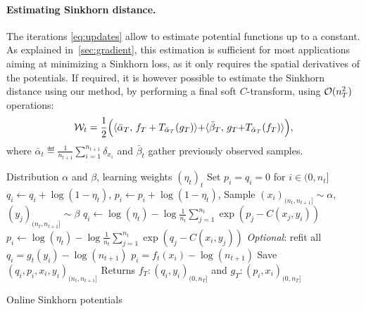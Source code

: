\paragraph{Estimating Sinkhorn distance.} 

The iterations \eqref{eq:updates} allow to estimate potential functions up to a constant. As explained in~\autoref{sec:gradient},
this estimation is sufficient for most applications aiming at minimizing a Sinkhorn loss, as it only requires the spatial derivatives of the potentials.
%
If required, it is however possible to estimate the Sinkhorn distance using our method, by performing a final soft $C$-transform, using $\Oo(n_T^2)$ operations:
\begin{equation}\label{eq-dist-est}
    \Ww_t = \frac{1}{2}\Big(\dotp{\bar \alpha_T}{f_T + \Ctrans{g_T}{\bar \alpha_T}}
     {+} \dotp{\bar \beta_T}{g_T {+} \Ctrans{f_T}{\bar \alpha_T}}\Big),
\end{equation}
where $\bar \alpha_t \eqdef \frac{1}{n_{t+1}}\sum_{i=1}^{n_{t+1}} \delta_{x_i}$
and $\bar \beta_t$ gather previously observed samples.

\begin{algorithm}[t]
    \begin{algorithmic}
    \Input Distribution $\alpha$ and $\beta$, learning weights ${(\eta_t)}_t$
    \State Set $p_i = q_i = 0$ for $i \in (0, n_t]$
        \For{$i \in (0, n_t]$}
        \State $q_i \gets q_i + \log(1 - \eta_t)$, $p_i \gets p_i + \log(1 - \eta_t)$,
        \EndFor
        \State Sample $(x_i)_{(n_t, n_{t+1}]} \sim \alpha$, $(y_j)_{(n_t, n_{t+1}]} \sim \beta$
        \For{$i \in (n_t, n_{t+1}]$}
            \State $q_i \gets 
            \log(\eta_t) - \log \frac{1}{n_t} 
            \sum_{j=1}^{n_t} \exp(p_j - C(x_j, y_i))$
            \State $p_i \gets 
            \log(\eta_t) - \log \frac{1}{n_t} 
            \sum_{j=1}^{n_t} \exp(q_j - C(x_i, y_j))$
        \EndFor
        \State \textit{Optional}: refit all $q_i = g_t(y_i) - \log (n_{t+1})$
        \State\hspace{2.45cm} $p_i = f_t(x_i) - \log (n_{t+1})$
        \State Save $(q_i, p_i, x_i, y_i)_{(n_t,n_{t+1}]}$
    \EndFor
    \State Returns $f_T : (q_i, y_i)_{(0, n_T]}$ and
    $g_T : (p_i, x_i)_{(0, n_T]}$
    \end{algorithmic}
    \caption{Online Sinkhorn potentials}\label{alg:online_sinkhorn}
\end{algorithm}


